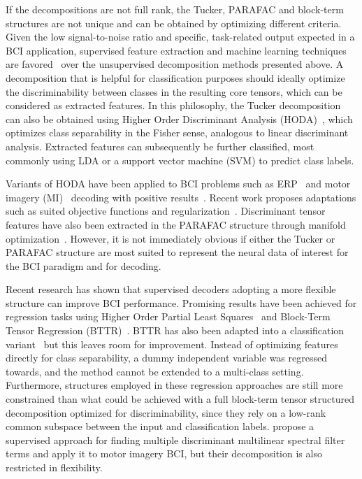 If the decompositions are not full rank, the Tucker, PARAFAC and block-term
structures are not unique and can be obtained by optimizing different criteria.
Given the low signal-to-noise ratio and specific, task-related output expected
in a BCI application, supervised feature extraction and machine learning techniques are
favored~\cite{Lotte2018} over the unsupervised decomposition methods presented
above.
A decomposition that is helpful for classification purposes should ideally optimize
the discriminability between classes in the resulting core tensors, which can
be considered as extracted features.
In this philosophy, the Tucker decomposition can also be obtained
using Higher Order Discriminant Analysis
(HODA)~\cite{Yan2005,Phan2010,Froelich2018}, which optimizes class separability in the Fisher sense, analogous to linear
discriminant analysis.
Extracted features can subsequently be further classified, most commonly
using LDA or a support vector machine (SVM) to predict class labels.

Variants of HODA have been applied to BCI problems such as
ERP~\cite{Onishi2012,Higashi2016} and motor imagery (MI)~\cite{Liu2015,Cai2021}
decoding with positive results~\cite{Lotte2018}.
Recent work proposes adaptations such as suited objective
functions and regularization~\cite{JamshidiIdaji2017,Jorajuria2022,Aghili2023}.
Discriminant tensor features have also been extracted
in the PARAFAC structure through manifold optimization~\cite{Froelich2018}.
However, it is not immediately obvious if either the Tucker or PARAFAC
structure are most suited to represent the neural data of interest for the BCI
paradigm and for decoding.

Recent research has shown that supervised decoders adopting a more flexible structure
can improve BCI performance.
Promising results have been achieved for regression tasks using
Higher Order Partial Least Squares~\cite{Camarrone2018} and Block-Term Tensor
Regression (BTTR)~\cite{Faes2022,Faes2022a}.
BTTR has also been adapted into a classification variant~\cite{Camarrone2021}
but this leaves room for improvement.
Instead of optimizing features directly for class separability, a dummy
independent variable was regressed towards, and the method
cannot be extended to a multi-class setting.
Furthermore, structures employed in these regression approaches are still more constrained
than what could be achieved with a full block-term tensor structured decomposition
optimized for discriminability, since they rely on a low-rank common subspace
between the input and classification labels.
\textcite{Huang2020} propose a supervised approach for finding multiple discriminant
multilinear spectral filter terms and apply it to motor imagery BCI, but their
decomposition is also restricted in flexibility.


